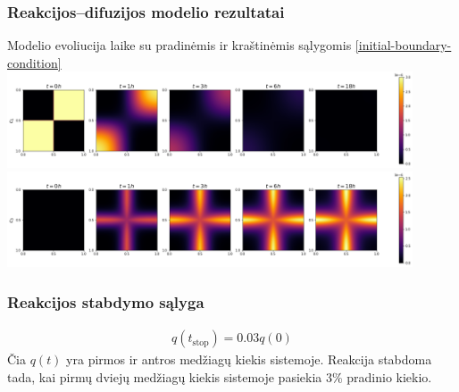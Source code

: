 \documentclass{beamer}
\begin{document}
\begin{frame}
    \frametitle{Reakcijos--difuzijos modelio rezultatai}
    Modelio evoliucija laike su pradinėmis ir kraštinėmis sąlygomis \eqref{initial-boundary-condition}
    \centering
    \includegraphics[width=12cm]{../paper/assets/example-0.png} \\ 
    \includegraphics[width=12cm]{../paper/assets/example-2.png}

\end{frame}

\begin{frame}
    \frametitle{Reakcijos stabdymo sąlyga}
    \begin{align*}
        q(t_\text{stop})=0.03q(0)
    \end{align*}
    Čia $q(t)$ yra pirmos ir antros medžiagų kiekis sistemoje. Reakcija stabdoma tada, kai pirmų dviejų medžiagų kiekis sistemoje pasiekia 3\% pradinio kiekio.
\end{frame}
\end{document}
